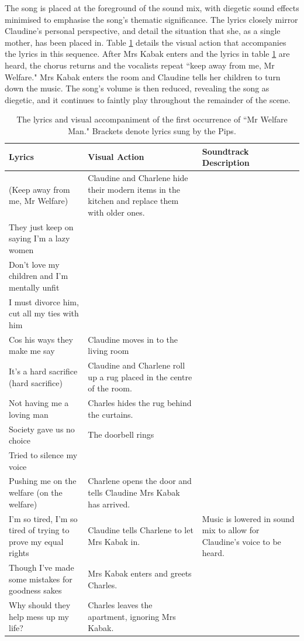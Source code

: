 The song is placed at the foreground of the sound mix, with diegetic sound effects minimised to emphasise the song's thematic significance.
The lyrics closely mirror Claudine's personal perspective, and detail the situation that she, as a single mother, has been placed in.
Table \ref{tab:claudine-welfare-kabak} details the visual action that accompanies the lyrics in this sequence.
After Mrs Kabak enters and the lyrics in table \ref{tab:claudine-welfare-kabak} are heard, the chorus returns and the vocalists repeat ``keep away from me, Mr Welfare."
Mrs Kabak enters the room and Claudine tells her children to turn down the music.
The song's volume is then reduced, revealing the song as diegetic, and it continues to faintly play throughout the remainder of the scene.

\begin{table}[h]
    \centering
    \begin{tabular}{>{\raggedright\arraybackslash}p{50mm}>{\raggedright\arraybackslash}p{50mm}>{\raggedright\arraybackslash}p{50mm}}\toprule
 Lyrics& Visual Action&Soundtrack Description\\\midrule
         (Keep away from me, Mr Welfare)&  Claudine and Charlene hide their modern items in the kitchen and replace them with older ones.& \\
         They just keep on saying I'm a lazy women&  & \\
         Don't love my children and I'm mentally unfit&  & \\
         I must divorce him, cut all my ties with him&  & \\
         Cos his ways they make me say&  Claudine moves in to the living room& \\
         It's a hard sacrifice (hard sacrifice)&  Claudine and Charlene roll up a rug placed in the centre of the room.& \\
         Not having me a loving man&  Charles hides the rug behind the curtains.& \\
         Society gave us no choice&  The doorbell rings& \\
         Tried to silence my voice&  & \\
         Pushing me on the welfare (on the welfare)&  Charlene opens the door and tells Claudine Mrs Kabak has arrived.& \\
 I'm so tired, I'm so tired of trying to prove my equal rights& Claudine tells Charlene to let Mrs Kabak in.&Music is lowered in sound mix to allow for Claudine's voice to be heard.\\
 Though I've made some mistakes for goodness sakes& Mrs Kabak enters and greets Charles.&\\
 Why should they help mess up my life?& Charles leaves the apartment, ignoring Mrs Kabak.&\\ \bottomrule 
    \end{tabular}
    \caption{The lyrics and visual accompaniment of the first occurrence of ``Mr Welfare Man." Brackets denote lyrics sung by the Pips.}
    \label{tab:claudine-welfare-kabak}
\end{table}

